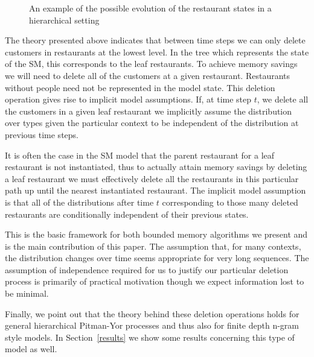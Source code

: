 \begin{figure}[t] 
	\begin{center}
		\caption{An example of the possible evolution of the restaurant states in a hierarchical setting}
	\end{center} 
	\label{figResultsCC}
\end{figure} 

The theory presented above indicates that between time steps we can only delete customers in restaurants at the lowest level.  In the tree which represents the state of the SM, this corresponds to the leaf restaurants.  To achieve memory savings we will need to delete all of the customers at a given restaurant.  Restaurants without people need not be represented in the model state.  This deletion operation gives rise to implicit model assumptions. If, at time step $t$, we delete all the customers in a given leaf restaurant we implicitly assume the distribution over types given the particular context to be independent of the distribution at previous time steps.

It is often the case in the SM model that the parent restaurant for a leaf restaurant is not instantiated, thus to actually attain memory savings by deleting a leaf restaurant we must effectively delete all the restaurants in this particular path up until the nearest instantiated restaurant.  The implicit model assumption is that all of the distributions after time $t$ corresponding to those many deleted restaurants are conditionally independent of their previous states.

This is the basic framework for both bounded memory algorithms we present and is the main contribution of this paper.  The assumption that, for many contexts, the distribution changes over time seems appropriate for very long sequences. The assumption of independence required for us to justify our particular deletion process is primarily of practical motivation though we expect information lost to be minimal. 

Finally, we point out that the theory behind these deletion operations holds for general hierarchical Pitman-Yor processes and thus also for finite depth n-gram style models.  In Section~\ref{results} we show some results concerning this type of model as well.
